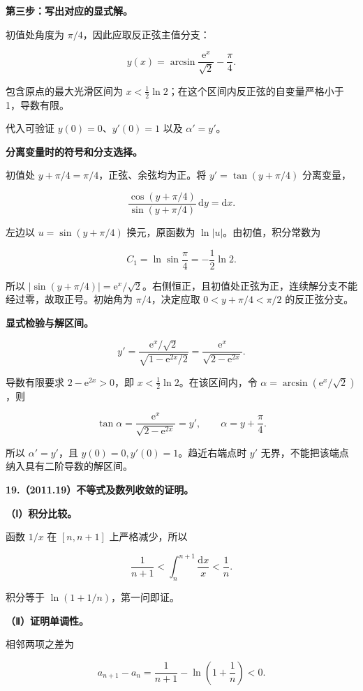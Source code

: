 \documentclass[UTF8,11pt,fontset=windows]{ctexart}
\begin{document}
\textbf{第三步：写出对应的显式解。}

初值处角度为 $\pi/4$，因此应取反正弦主值分支：

$$
y(x)=\arcsin\frac{\mathrm e^x}{\sqrt2}-\frac\pi4.
$$

包含原点的最大光滑区间为 $x<\frac12\ln2$；在这个区间内反正弦的自变量严格小于1，导数有限。

代入可验证 $y(0)=0$、$y'(0)=1$ 以及 $\alpha'=y'$。

\textbf{分离变量时的符号和分支选择。}

初值处 $y+\pi/4=\pi/4$，正弦、余弦均为正。将 $y'=\tan(y+\pi/4)$ 分离变量，

$$
\frac{\cos(y+\pi/4)}{\sin(y+\pi/4)}\,\mathrm dy=\mathrm dx.
$$

左边以 $u=\sin(y+\pi/4)$ 换元，原函数为 $\ln|u|$。由初值，积分常数为

$$
C_1=\ln\sin\frac\pi4=-\frac12\ln2.
$$

所以 $|\sin(y+\pi/4)|=\mathrm e^x/\sqrt2$。右侧恒正，且初值处正弦为正，连续解分支不能经过零，故取正号。初始角为 $\pi/4$，决定应取 $0<y+\pi/4<\pi/2$ 的反正弦分支。

\textbf{显式检验与解区间。}

$$
y'=\frac{\mathrm e^x/\sqrt2}{\sqrt{1-\mathrm e^{2x}/2}}
=\frac{\mathrm e^x}{\sqrt{2-\mathrm e^{2x}}}.
$$

导数有限要求 $2-\mathrm e^{2x}>0$，即 $x<\frac12\ln2$。在该区间内，令 $\alpha=\arcsin(\mathrm e^x/\sqrt2)$，则

$$
\tan\alpha=\frac{\mathrm e^x}{\sqrt{2-\mathrm e^{2x}}}=y',
\qquad\alpha=y+\frac\pi4.
$$

所以 $\alpha'=y'$，且 $y(0)=0,y'(0)=1$。趋近右端点时 $y'$ 无界，不能把该端点纳入具有二阶导数的解区间。

\clearpage

\textbf{19.（2011.19）不等式及数列收敛的证明。}

\textbf{（Ⅰ）积分比较。}

函数 $1/x$ 在 $[n,n+1]$ 上严格减少，所以

$$
\frac1{n+1}<\int_n^{n+1}\frac{\mathrm dx}{x}<\frac1n.
$$

积分等于 $\ln(1+1/n)$，第一问即证。

\textbf{（Ⅱ）证明单调性。}

相邻两项之差为

$$
a_{n+1}-a_n=\frac1{n+1}-\ln\left(1+\frac1n\right)<0.
$$
\end{document}
